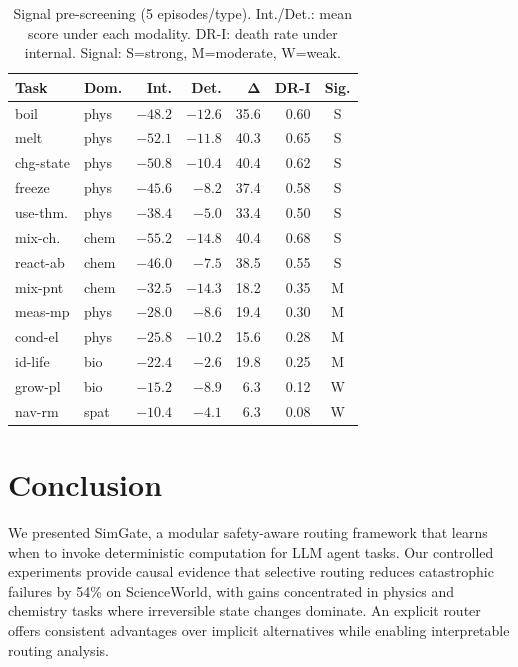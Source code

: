 \documentclass[11pt,a4paper]{article}
\begin{document}
\begin{table}[t]
\centering
\small
\begin{tabular}{@{}llrrrrc@{}}
\toprule
\textbf{Task} & \textbf{Dom.} & \textbf{Int.} & \textbf{Det.} & $\boldsymbol{\Delta}$ & \textbf{DR-I} & \textbf{Sig.} \\
\midrule
boil & phys & $-48.2$ & $-12.6$ & 35.6 & 0.60 & S \\
melt & phys & $-52.1$ & $-11.8$ & 40.3 & 0.65 & S \\
chg-state & phys & $-50.8$ & $-10.4$ & 40.4 & 0.62 & S \\
freeze & phys & $-45.6$ & $-8.2$ & 37.4 & 0.58 & S \\
use-thm. & phys & $-38.4$ & $-5.0$ & 33.4 & 0.50 & S \\
mix-ch. & chem & $-55.2$ & $-14.8$ & 40.4 & 0.68 & S \\
react-ab & chem & $-46.0$ & $-7.5$ & 38.5 & 0.55 & S \\
\midrule
mix-pnt & chem & $-32.5$ & $-14.3$ & 18.2 & 0.35 & M \\
meas-mp & phys & $-28.0$ & $-8.6$ & 19.4 & 0.30 & M \\
cond-el & phys & $-25.8$ & $-10.2$ & 15.6 & 0.28 & M \\
id-life & bio & $-22.4$ & $-2.6$ & 19.8 & 0.25 & M \\
\midrule
grow-pl & bio & $-15.2$ & $-8.9$ & 6.3 & 0.12 & W \\
nav-rm & spat & $-10.4$ & $-4.1$ & 6.3 & 0.08 & W \\
\bottomrule
\end{tabular}
\caption{Signal pre-screening (5 episodes/type). Int./Det.: mean score under each modality. DR-I: death rate under internal. Signal: S=strong, M=moderate, W=weak.}
\label{tab:prescreening}
\end{table}

\section{Conclusion}

We presented SimGate, a modular safety-aware routing framework that learns when to invoke deterministic computation for LLM agent tasks. Our controlled experiments provide causal evidence that selective routing reduces catastrophic failures by 54\% on ScienceWorld, with gains concentrated in physics and chemistry tasks where irreversible state changes dominate. An explicit router offers consistent advantages over implicit alternatives while enabling interpretable routing analysis.
\end{document}
